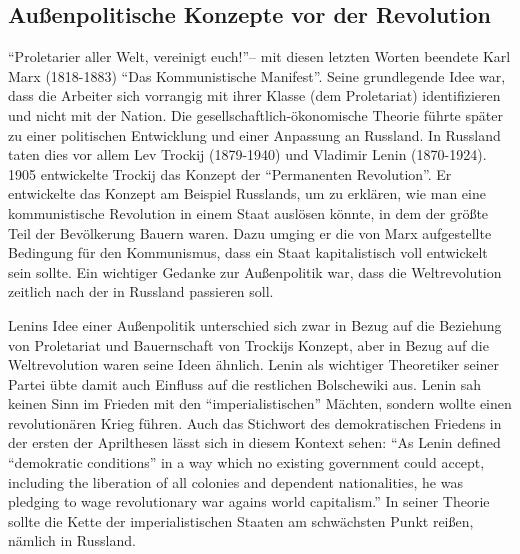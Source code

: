 \documentclass[12pt,headsepline,a4paper]{scrartcl}
\begin{document}
\subsection{Außenpolitische Konzepte vor der Revolution}
\label{sec: for_policy}
"`Proletarier aller Welt, vereinigt euch!"'-- mit diesen letzten Worten beendete Karl Marx (1818-1883) "`Das Kommunistische Manifest"'. Seine grundlegende Idee war, dass die Arbeiter sich vorrangig mit ihrer Klasse (dem Proletariat) identifizieren und nicht mit der Nation. Die gesellschaftlich-ökonomische Theorie führte später zu einer politischen Entwicklung und einer Anpassung an Russland. In Russland taten dies vor allem Lev Trockij (1879-1940) und Vladimir Lenin (1870-1924).
1905 entwickelte Trockij das Konzept der "`Permanenten Revolution"'. 
Er entwickelte das Konzept am Beispiel Russlands, um zu erklären, wie man eine kommunistische Revolution in einem Staat auslösen könnte, in dem der größte Teil der Bevölkerung Bauern waren. Dazu umging er die von Marx aufgestellte Bedingung für den Kommunismus, dass ein Staat kapitalistisch voll entwickelt sein sollte. 
Ein wichtiger Gedanke zur Außenpolitik war, dass die Weltrevolution zeitlich nach der in Russland passieren soll.

Lenins Idee einer Außenpolitik unterschied sich zwar in Bezug auf die Beziehung von Proletariat und Bauernschaft von Trockijs Konzept, aber in Bezug auf die Weltrevolution waren seine Ideen ähnlich. Lenin als wichtiger Theoretiker seiner Partei übte damit auch Einfluss auf die restlichen Bolschewiki aus. Lenin sah keinen Sinn im Frieden mit den "`imperialistischen"' Mächten, sondern wollte einen revolutionären Krieg führen.\autocite[1]{maka2010}
Auch das Stichwort des demokratischen Friedens in der ersten der Aprilthesen lässt sich in diesem Kontext sehen: "`As Lenin defined "`demokratic conditions"' in a way which no existing government could accept, including the liberation of all colonies and dependent nationalities, he was pledging to wage revolutionary war agains world capitalism."'\autocite[7]{debo1979}
In seiner Theorie sollte die Kette der imperialistischen Staaten am schwächsten Punkt reißen, nämlich in Russland.
\end{document}
